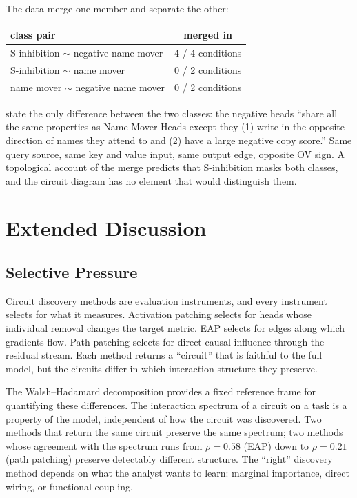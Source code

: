 \documentclass{article}
\begin{document}
The data merge one member and separate the other:

\begin{center}
\begin{tabular}{lc}
\toprule
class pair & merged in \\
\midrule
S-inhibition $\sim$ negative name mover & 4 / 4 conditions \\
S-inhibition $\sim$ name mover & 0 / 2 conditions \\
name mover $\sim$ negative name mover & 0 / 2 conditions \\
\bottomrule
\end{tabular}
\end{center}

\citet{wang2022ioi} state the only difference between the two classes: the negative heads
``share all the same properties as Name Mover Heads except they (1) write in the opposite
direction of names they attend to and (2) have a large negative copy score.'' Same query
source, same key and value input, same output edge, opposite OV sign. A topological account
of the merge predicts that S-inhibition masks both classes, and the circuit diagram has no
element that would distinguish them.


\section{Extended Discussion}


\subsection{Selective Pressure}

Circuit discovery methods are evaluation instruments, and every
instrument selects for what it measures. Activation patching selects for
heads whose individual removal changes the target metric. EAP selects
for edges along which gradients flow. Path patching selects for direct
causal influence through the residual stream. Each method returns a
``circuit'' that is faithful to the full model, but the circuits differ
in which interaction structure they preserve.

The Walsh--Hadamard decomposition provides a fixed reference frame for
quantifying these differences. The interaction spectrum of a circuit on
a task is a property of the model, independent of how the circuit was
discovered. Two methods that return the same circuit preserve the same
spectrum; two methods whose agreement with the spectrum runs from
$\rho = 0.58$ (EAP) down to $\rho = 0.21$ (path patching) preserve
detectably different structure. The ``right'' discovery method depends on what
the analyst wants to learn: marginal importance, direct wiring, or
functional coupling.
\end{document}
